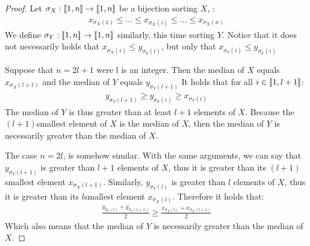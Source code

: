 \begin{proof}
    Let $\sigma_X:[\![1,n]\!]\rightarrow[\![1,n]\!]$ be a bijection sorting $X$, \ie:
    \begin{align}
        x_{\sigma_X(1)}\leqslant\dots\leqslant x_{\sigma_X(i)}\leqslant\dots\leqslant x_{\sigma_X(n)}
    \end{align}
    We define $\sigma_Y:[\![1,n]\!]\rightarrow[\![1,n]\!]$ similarly, this time sorting $Y$. Notice that it does not necessarily holds that $x_{\sigma_X(i)}\leqslant y_{\sigma_Y(i)}$, but only that $x_{\sigma_Y(i)}\leqslant y_{\sigma_Y(i)}$ 
    
    Suppose that $n=2l+1$ were l is an integer. Then the median of $X$ equals $x_{\sigma_X(l+1)}$ and the median of $Y$ equals $y_{\sigma_Y(l+1)}$ 
    It holds that for all $i\in[\![1,l+1]\!]$:
    \begin{align}
        y_{\sigma_Y(l+1)}\geqslant y_{\sigma_Y(i)}\geqslant x_{\sigma_Y(i)}
    \end{align}
    The median of $Y$ is thus greater than at least $l+1$ elements of $X$. Because the $(l+1)$\ith smallest element of $X$ is the median of $X$, then the median of $Y$ is necessarily greater than the median of $X$.
    
    The case $n=2l$, is somehow similar. With the same arguments, we can say that $y_{\sigma_Y(l+1)}$ is greater than $l+1$ elements of $X$, thus it is greater than its $(l+1)$\ith smallest element $x_{\sigma_X(l+1)}$. Similarly, $y_{\sigma_Y(l)}$ is greater than $l$ elements of $X$, thus it is greater than its $l$\ith smallest element $x_{\sigma_X(l)}$. Therefore it holds that:
    \begin{align}
        \frac{y_{\sigma_Y(l)}+y_{\sigma_Y(l+1)}}{2}\geqslant\frac{x_{\sigma_X(l)}+x_{\sigma_X(l+1)}}{2}
    \end{align}
    Which also means that the median of $Y$ is necessarily greater than the median of $X$.
\end{proof}

\pagebreak